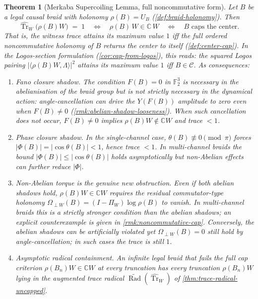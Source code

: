 \documentclass[11pt,a4paper]{article}
\theoremstyle{plain}
\newtheorem{theorem}{Theorem}[section]
\theoremstyle{definition}
\theoremstyle{remark}
\numberwithin{equation}{section}
\newcommand{\Complex}{\mathbb{C}}
\newcommand{\F}{\mathbb{F}}
\DeclareMathOperator{\Tr}{Tr}
\DeclareMathOperator{\Rad}{Rad}
\begin{document}
\begin{theorem}[Merkaba Supercoiling Lemma, full noncommutative form]
\label{thm:supercoiling-lemma}
Let $B$ be a legal causal braid with holonomy
$\rho(B)=U_B$ (\cref{def:braid-holonomy}).  Then
\[
  \widehat{\Tr}_W\bigl(\rho(B)W\bigr)\;=\;1
  \quad\Longleftrightarrow\quad
  \rho(B)\,W\in\Complex\,W
  \quad\Longleftrightarrow\quad
  B\text{ caps the center.}
\]
That is, the witness trace attains its maximum value $1$ iff the
\emph{full ordered noncommutative holonomy} of $B$ returns the
center to itself (\cref{def:center-cap}).  In the
Logos-section formulation
(\cref{cor:cap-from-logos}), this reads: the squared Logos
pairing $|\langle\rho(B)W,\Lambda\rangle|^2$ attains its maximum
value $1$ iff $B\in\mathcal{C}$.  As consequences:
\begin{enumerate}
  \item[\textup{(S1)}] \emph{Fano closure shadow.}  The condition
        $F(B)=0$ in $\F_2^3$ is necessary in the abelianisation of
        the braid group but is \emph{not strictly necessary} in
        the dynamical action: angle-cancellation can drive the
        $Y(F(B))$ amplitude to zero even when $F(B)\ne 0$
        (\cref{rmk:abelian-shadow-looseness}).  When such
        cancellation does not occur, $F(B)\ne 0$ implies
        $\rho(B)W\notin\Complex W$ and trace $<1$.
  \item[\textup{(S2)}] \emph{Phase closure shadow.}  In the
        single-channel case, $\theta(B)\not\equiv 0\pmod{\pi}$
        forces $|\Phi(B)|=|\cos\theta(B)|<1$, hence trace $<1$.
        In multi-channel braids the bound
        $|\Phi(B)|\le|\cos\theta(B)|$ holds asymptotically but
        non-Abelian effects can further reduce $|\Phi|$.
  \item[\textup{(S3)}] \emph{Non-Abelian torque is the genuine
        new obstruction.}  Even if both abelian shadows hold,
        $\rho(B)W\in\Complex W$ requires the residual
        commutator-type holonomy
        $\Omega_{\perp W}(B)=(I-\Pi_W)\log\rho(B)$
        to vanish.  In multi-channel braids this is a strictly
        stronger condition than the abelian shadows; an explicit
        counterexample is given in \cref{rmk:noncommutative-cap}.
        Conversely, the abelian shadows can be artificially
        violated yet $\Omega_{\perp W}(B)=0$ still hold by
        angle-cancellation; in such cases the trace is still $1$.
  \item[\textup{(S4)}] \emph{Asymptotic radical containment.}
        An infinite legal braid that fails the full cap criterion
        $\rho(B_n)W\in\Complex W$ at every truncation has every
        truncation $\rho(B_n)W$ lying in the augmented trace
        radical $\widetilde{\Rad}(\widehat{\Tr}_W)$ of
        \cref{thm:trace-radical-uncapped}.
\end{enumerate}
\end{theorem}
\end{document}
